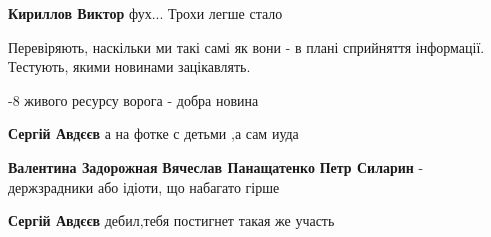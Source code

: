 \begin{itemize}
\begin{itemize}
\begin{itemize}
\textbf{Кириллов Виктор} фух... Трохи легше стало
\end{itemize}

\end{itemize}

 
Перевіряють, наскільки ми такі самі як вони - в плані сприйняття інформації. Тестують, якими новинами зацікавлять.

 
-8 живого ресурсу ворога - добра новина

\begin{itemize}
 
\textbf{Сергій Авдєєв} а на фотке с детьми ,а сам иуда

\begin{itemize}
 
\textbf{Валентина Задорожная} \textbf{Вячеслав Панащатенко}
\textbf{Петр Силарин} - держзрадники або ідіоти, що набагато гірше
\end{itemize}

 
\textbf{Сергій Авдєєв} дебил,тебя постигнет такая же участь

 

\end{itemize}
\end{itemize}
